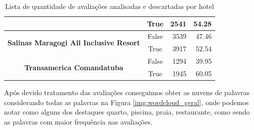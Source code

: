 \begin{table}[h]
\begin{tabular}{|c|c|r|r|}
		                                                                        &
		True                                                                    &
		2541                                                                    &
		54.28                                                                     \\ \hline
		\multirow{2}{*}{\textbf{Salinas Maragogi All Inclusive Resort}}         &
		False                                                                   &
		3539                                                                    &
		47.46                                                                     \\ \cline{2-4}
		                                                                        &
		True                                                                    &
		3917                                                                    &
		52.54                                                                     \\ \hline
		\multirow{2}{*}{\textbf{Transamerica Comandatuba}}                      &
		False                                                                   &
		1294                                                                    &
		39.95                                                                     \\ \cline{2-4}
		                                                                        &
		True                                                                    &
		1945                                                                    &
		60.05                                                                     \\ \hline
	\end{tabular}
	\caption{Lista de quantidade de avaliações analisadas e descartadas por hotel}
	\label{tab:lista_review_hoteis}
\end{table}

Após devido tratamento das avaliações conseguimos obter as nuvens de palavras considerando todas as palavras na Figura \ref{img:wordcloud_geral}, onde podemos notar como alguns dos destaques quarto, piscina, praia, restaurante, como sendo as palavras com maior frequência nas avaliações.

